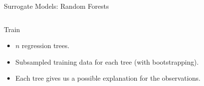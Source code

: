 \begin{frame}[c]{Surrogate Models: Random Forests}

\begin{columns}[T] %
\begin{column}{.48\textwidth}


\begin{block}{Train}
\begin{itemize}
	\item<1-6> $n$ regression trees. 
	\item<2-6> Subsampled training data for each tree (with bootstrapping).
	\item<3-6> Each tree gives us a possible explanation for the observations.
\end{itemize}
\end{block}

\end{column}%


\hfill%

\begin{column}{.48\textwidth}
\end{column}
\end{columns}

\end{frame}

